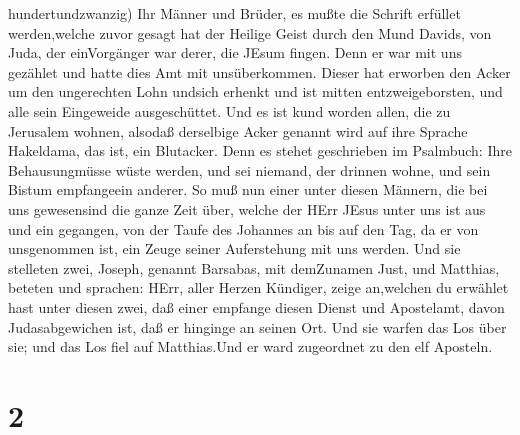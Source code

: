hundertundzwanzig)  Ihr Männer und Brüder, es mußte die
Schrift erfüllet werden,welche zuvor gesagt hat der Heilige Geist durch
den Mund Davids, von Juda, der einVorgänger war derer, die JEsum fingen.
 Denn er war mit uns gezählet und hatte dies Amt mit
unsüberkommen.  Dieser hat erworben den Acker um den
ungerechten Lohn undsich erhenkt und ist mitten entzweigeborsten, und
alle sein Eingeweide ausgeschüttet.  Und es ist kund worden
allen, die zu Jerusalem wohnen, alsodaß derselbige Acker genannt wird
auf ihre Sprache Hakeldama, das ist, ein Blutacker.  Denn
es stehet geschrieben im Psalmbuch: Ihre Behausungmüsse wüste werden,
und sei niemand, der drinnen wohne, und sein Bistum empfangeein anderer.
 So muß nun einer unter diesen Männern, die bei uns
gewesensind die ganze Zeit über, welche der HErr JEsus unter uns ist aus
und ein gegangen,  von der Taufe des Johannes an bis auf
den Tag, da er von unsgenommen ist, ein Zeuge seiner Auferstehung mit
uns werden.  Und sie stelleten zwei, Joseph, genannt
Barsabas, mit demZunamen Just, und Matthias,  beteten und
sprachen: HErr, aller Herzen Kündiger, zeige an,welchen du erwählet hast
unter diesen zwei,  daß einer empfange diesen Dienst und
Apostelamt, davon Judasabgewichen ist, daß er hinginge an seinen Ort.
 Und sie warfen das Los über sie; und das Los fiel auf
Matthias.Und er ward zugeordnet zu den elf Aposteln.

\hypertarget{section-1}{%
\section{2}\label{section-1}}

